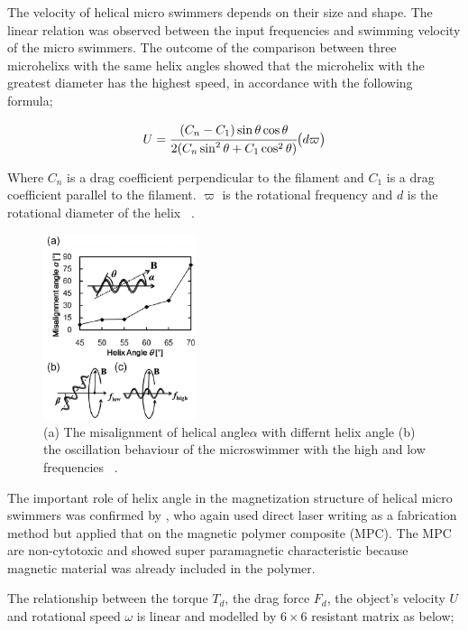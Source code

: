 \documentclass[a4paper,11pt]{article}
\begin{document}
\begin{sloppypar}
The velocity of helical micro swimmers depends on their size and shape. The linear relation was 
observed between the input frequencies and swimming velocity of the micro swimmers. The outcome of 
the comparison between three microhelixs with the same helix angles showed that the microhelix with the
 greatest diameter has the highest speed, in accordance with the following formula;

\begin{equation}
  U = {\cfrac{(C_n - C_1) \sin \theta \cos \theta}{2(C_n \sin^2 \theta + C_1 \cos^2 \theta)}} \big( d \varpi \big)
\end{equation} 

Where $C_n$ is a drag coefficient perpendicular to the filament and $C_1$ is a drag coefficient
 parallel to the filament. $ \varpi$ is the rotational frequency and $d$ is the rotational diameter of 
the helix ~\citep{tottori2012magnetic}.  

\begin{figure}
  \centering
    \includegraphics[width=0.4\textwidth]{7}
  \caption{(a) The misalignment of helical angle$\alpha$ with differnt helix angle (b) the oscillation behaviour
of the microswimmer with the high and low frequencies ~\citep{tottori2012magnetic}.}
  \label{ref7}
\end{figure}


The important role of helix angle in the magnetization structure of helical micro swimmers 
was confirmed by \citeauthor{peyer2013bacteria}, who again used direct laser writing as a fabrication method but 
applied that on the magnetic polymer composite (MPC). The MPC are non-cytotoxic and showed 
super paramagnetic characteristic because magnetic material was already included in the polymer. 

The relationship between the torque $T_d$, the drag force $F_d$, the object\rq{}s velocity $U$ and rotational 
speed $\omega$ is linear and modelled by $6\times6$ resistant matrix as below;




\end{sloppypar}
\end{document}
